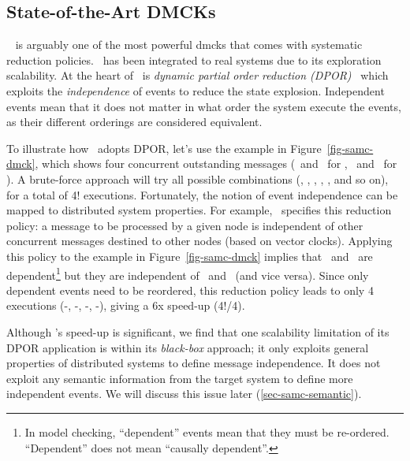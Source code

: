 


\subsection{State-of-the-Art DMCKs}
\label{mot-samc-state}



\modist~\cite{Yang+09-Modist} is arguably one of the most powerful dmcks that
comes with systematic reduction policies.  \modist\ has been integrated to real
systems due to its exploration scalability.  At the heart of \modist\ is {\em
dynamic partial order reduction (DPOR)}~\cite{Flanagan+05-Dpor} which exploits
the {\em independence} of events to reduce the state explosion.  Independent
events mean that it does not matter in what order the system execute the
events, as their different orderings are considered equivalent.

To illustrate how \modist\ adopts DPOR, let's use the example in
Figure~\ref{fig-samc-dmck}, which shows four concurrent outstanding messages
 (\ma\ and \mb\ for \none, \mc\ and \md\ for \ntwo).  A brute-force
approach will try all possible combinations (, , ,
, , and so on), for a total of 4!  executions.
Fortunately, the notion of event independence can be mapped to distributed
system properties.  For example, \modist\ specifies this reduction policy: a
message to be processed by a given node is independent of other concurrent
messages destined to other nodes (based on vector clocks).  Applying this
policy to the example in Figure~\ref{fig-samc-dmck} implies that \ma\ and \mb\ are
dependent\footnote[1]{In model checking, ``dependent'' events mean that they
must be re-ordered.  ``Dependent'' does not mean ``causally dependent''.}  but
they are independent of \mc\ and \md\ (and vice versa).  Since only dependent
events need to be reordered, this reduction policy leads to only 4 executions
(\ma\mb-\mc\md, \ma\mb-\md\mc, \mb\ma-\mc\md, \mb\ma-\md\mc), giving a 6x
speed-up (4!/4).


Although \modist's speed-up is significant, we find that one
scalability limitation of its DPOR application is within its {\em
  black-box} approach; it only exploits general properties of
distributed systems to define message independence.  It does not
exploit any semantic information from the target system to define more
independent events.  We will discuss this issue later
(\sec\ref{sec-samc-semantic}).



